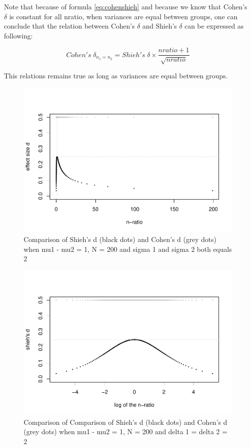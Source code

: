 \documentclass[
  man]{apa6}
\begin{document}
Note that because of formula \ref{eq:cohenshieh} and because we know that Cohen's \(\delta\) is constant for all nratio, when variances are equal between groups, one can conclude that the relation between Cohen's \(\delta\) and Shieh's \(\delta\) can be expressed as following:

\begin{equation} 
Cohen's \; \delta_{n_1=n_2}= Shieh's \; \delta \times \frac{nratio+1}{\sqrt{nratio}}
\label{eq:shiehvsmax}
\end{equation}

This relations remains true as long as variances are equal between groups.

\begin{figure}
\centering
\includegraphics{Appendix1_files/figure-latex/SHIEH1-1.pdf}
\caption{\label{fig:SHIEH1}Comparison of Shieh's d (black dots) and Cohen's d (grey dots) when mu1 - mu2 = 1, N = 200 and sigma 1 and sigma 2 both equals 2}
\end{figure}

\begin{figure}
\centering
\includegraphics{Appendix1_files/figure-latex/SHIEH2-1.pdf}
\caption{\label{fig:SHIEH2}Comparison of Comparison of Shieh's d (black dots) and Cohen's d (grey dots) when mu1 - mu2 = 1, N = 200 and delta 1 = delta 2 = 2}
\end{figure}
\end{document}
